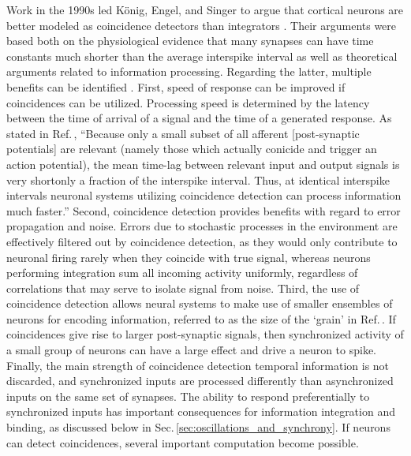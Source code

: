 Work in the 1990s led K\"{o}nig, Engel, and Singer to argue that cortical neurons are better modeled as coincidence detectors than integrators \cite{koen1996}. Their arguments were based both on the physiological evidence that many synapses can have time constants much shorter than the average interspike interval as well as theoretical arguments related to information processing. Regarding the latter, multiple benefits can be identified \cite{sase2000,sase2001}. First, speed of response can be improved if coincidences can be utilized. Processing speed is determined by the latency between the time of arrival of a signal and the time of a generated response. As stated in Ref.\,, ``Because only a small subset of all afferent [post-synaptic potentials] are relevant (namely those which actually conicide and trigger an action potential), the mean time-lag between relevant input and output signals is very short\textemdash only a fraction of the interspike interval. Thus, at identical interspike intervals neuronal systems utilizing coincidence detection can process information much faster.'' Second, coincidence detection provides benefits with regard to error propagation and noise. Errors due to stochastic processes in the environment are effectively filtered out by coincidence detection, as they would only contribute to neuronal firing rarely when they coincide with true signal, whereas neurons performing integration sum all incoming activity uniformly, regardless of correlations that may serve to isolate signal from noise. Third, the use of coincidence detection allows neural systems to make use of smaller ensembles of neurons for encoding information, referred to as the size of the `grain' in Ref.\,. If coincidences give rise to larger post-synaptic signals, then synchronized activity of a small group of neurons can have a large effect and drive a neuron to spike. Finally, the main strength of coincidence detection temporal information is not discarded, and synchronized inputs are processed differently than asynchronized inputs on the same set of synapses. The ability to respond preferentially to synchronized inputs has important consequences for information integration and binding, as discussed below in Sec.\,\ref{sec:oscillations_and_synchrony}. If neurons can detect coincidences, several important computation become possible. 

